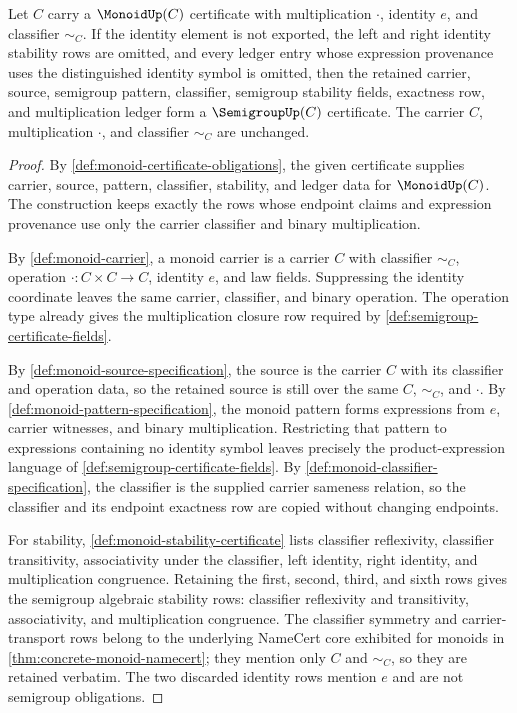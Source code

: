 \begin{proposition}
\label{prop:monoid-forgets-semigroup-certificate}
Let $C$ carry a $\MonoidUp(C)$ certificate with multiplication $\cdot$, identity $e$, and classifier $\sim_C$. If the identity element is not exported, the left and right identity stability rows are omitted, and every ledger entry whose expression provenance uses the distinguished identity symbol is omitted, then the retained carrier, source, semigroup pattern, classifier, semigroup stability fields, exactness row, and multiplication ledger form a $\SemigroupUp(C)$ certificate. The carrier $C$, multiplication $\cdot$, and classifier $\sim_C$ are unchanged.
\end{proposition}
\begin{proof}
By \autoref{def:monoid-certificate-obligations}, the given certificate supplies carrier, source, pattern, classifier, stability, and ledger data for $\MonoidUp(C)$. The construction keeps exactly the rows whose endpoint claims and expression provenance use only the carrier classifier and binary multiplication.

By \autoref{def:monoid-carrier}, a monoid carrier is a carrier $C$ with classifier $\sim_C$, operation $\cdot:C\times C\to C$, identity $e$, and law fields. Suppressing the identity coordinate leaves the same carrier, classifier, and binary operation. The operation type already gives the multiplication closure row required by \autoref{def:semigroup-certificate-fields}.

By \autoref{def:monoid-source-specification}, the source is the carrier $C$ with its classifier and operation data, so the retained source is still over the same $C$, $\sim_C$, and $\cdot$. By \autoref{def:monoid-pattern-specification}, the monoid pattern forms expressions from $e$, carrier witnesses, and binary multiplication. Restricting that pattern to expressions containing no identity symbol leaves precisely the product-expression language of \autoref{def:semigroup-certificate-fields}. By \autoref{def:monoid-classifier-specification}, the classifier is the supplied carrier sameness relation, so the classifier and its endpoint exactness row are copied without changing endpoints.

For stability, \autoref{def:monoid-stability-certificate} lists classifier reflexivity, classifier transitivity, associativity under the classifier, left identity, right identity, and multiplication congruence. Retaining the first, second, third, and sixth rows gives the semigroup algebraic stability rows: classifier reflexivity and transitivity, associativity, and multiplication congruence. The classifier symmetry and carrier-transport rows belong to the underlying NameCert core exhibited for monoids in \autoref{thm:concrete-monoid-namecert}; they mention only $C$ and $\sim_C$, so they are retained verbatim. The two discarded identity rows mention $e$ and are not semigroup obligations.


\end{proof}

